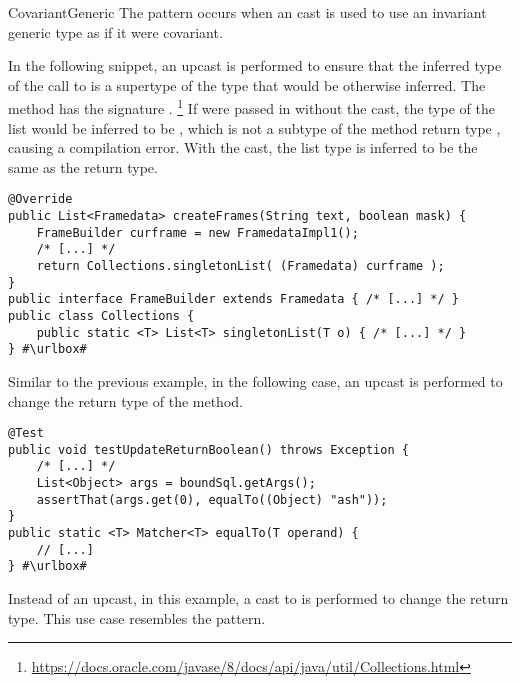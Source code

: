 \begin{pattern}{CovariantGeneric}
The \thisp{} pattern occurs when an cast is used to use an invariant generic type as if it were covariant.

\instances{}
In the following snippet,
an upcast is performed to ensure that the inferred type of the call to  is a supertype of the type that would be otherwise inferred.
The  method has the signature .%
\footnote{\url{https://docs.oracle.com/javase/8/docs/api/java/util/Collections.html}}
If  were passed in without the cast,
the type of the list would be inferred to be ,
which is not a subtype of the method return type ,
causing a compilation error.
With the cast, the list type is inferred to be the same as the return type.

\def\urlvar{http://bit.ly/arpruss_raspberryjammod_2USL7Ai}
\begin{verbatim}
@Override
public List<Framedata> createFrames(String text, boolean mask) {
    FrameBuilder curframe = new FramedataImpl1();
    /* [...] */
    return Collections.singletonList( (Framedata) curframe );
}
public interface FrameBuilder extends Framedata { /* [...] */ }
public class Collections {
    public static <T> List<T> singletonList(T o) { /* [...] */ }
} #\urlbox#
\end{verbatim}

Similar to the previous example, in the following case,
an upcast is performed to change the return type of the
 method.

\def\urlvar{http://bit.ly/jfaster_mango_2EhXzUW}
\begin{verbatim}
@Test
public void testUpdateReturnBoolean() throws Exception {
    /* [...] */
    List<Object> args = boundSql.getArgs();
    assertThat(args.get(0), equalTo((Object) "ash"));
}
public static <T> Matcher<T> equalTo(T operand) {
    // [...]
} #\urlbox#
\end{verbatim}

Instead of an upcast, in this example,
a cast to  is performed to change the return type.
This use case resembles the  pattern.


\end{pattern}
